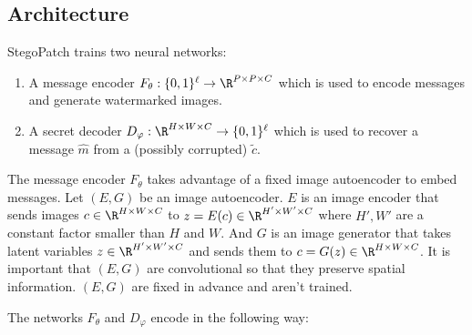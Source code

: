 \documentclass[twocolumn]{article}
\begin{document}
\subsection{Architecture}
StegoPatch trains two neural networks:
\begin{enumerate}[label=(\roman*)]
\item A message encoder $F_\theta: \{0, 1\}^{\ell} \to \R^{P \times P \times C}$ which is used to encode messages and generate watermarked images.
\item A secret decoder $D_\varphi: \R^{H\times W\times C} \to \{0, 1\}^{\ell}$ which is used to recover a message $\hat m$ from a (possibly corrupted) $\tilde c$.	
\end{enumerate}

The message encoder $F_\theta$ takes advantage of a fixed image autoencoder to embed messages. Let $(E, G)$ be an image autoencoder. $E$ is an image encoder that sends images $c\in \R^{H\times W\times C}$ to $z = E(c) \in \R^{H'\times W'\times C}$ where $H', W'$ are a constant factor smaller than $H$ and $W$. And $G$ is an image generator that takes latent variables $z\in \R^{H'\times W'\times C}$ and sends them to $c = G(z) \in \R^{H\times W\times C}$. It is important that $(E, G)$ are convolutional so that they preserve spatial information. $(E, G)$ are fixed in advance and aren't trained.

The networks $F_\theta$ and $D_\varphi$ encode in the following way:
\end{document}
